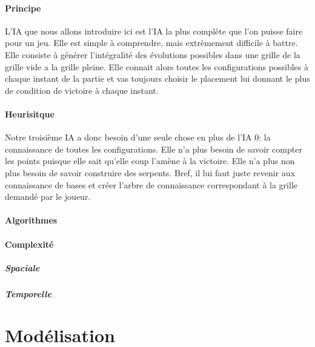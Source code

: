 \documentclass[a4paper,12pt]{report}
\begin{document}
\subsection{Principe}

L'IA que nous allons introduire ici est l'IA la plus compl\`ete que l'on puisse faire pour un jeu. Elle est simple \`a comprendre, mais extr\`emement difficile \`a battre. Elle consiste \`a g\'en\'erer l'int\'egralit\'e des \'evolutions possibles dans une grille de la grille vide a la grille pleine. Elle connait alors toutes les configurations possibles \`a chaque instant de la partie et vas toujours choisir le placement lui donnant le plus de condition de victoire \`a chaque instant.

\subsection{Heurisitque}

Notre troisi\`eme IA a donc besoin d'une seule chose en plus de l'IA 0: la connaissance de toutes les configurations. Elle n'a plus besoin de savoir compter les points puisque elle sait qu'elle coup l'am\`ene \`a la victoire. Elle n'a plus non plus besoin de savoir construire des serpents. Bref, il lui faut juste revenir aux connaissance de bases et cr\'eer l'arbre de connaissance correspondant \`a la grille demand\'e par le joueur.

\subsection{Algorithmes}

\subsection{Complexit\'e}

\subsubsection{Spaciale}

\subsubsection{Temporelle}

\part{Mod\'elisation}
\end{document}

